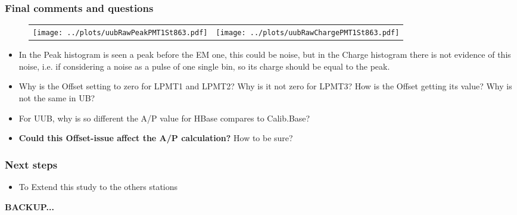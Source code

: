 \documentclass[aspectratio=169]{beamer}
\begin{document}
\begin{frame}
	\frametitle{Final comments and questions}
	
	\begin{figure}
		\centering
		\begin{tabularx}{\textwidth}{CC}
			\texttt{[image: ../plots/uubRawPeakPMT1St863.pdf]}
			&
			\texttt{[image: ../plots/uubRawChargePMT1St863.pdf]}
		\end{tabularx}
	\end{figure}

	\begin{itemize}
		\item In the Peak histogram is seen a peak before the EM one, this could 
			be noise, but in the Charge histogram there is not evidence of this noise,
			i.e. if considering a noise as a pulse of one single bin, so its charge 
			should be equal to the peak.
			\vspace{0.1cm}
		\item Why is the Offset setting to zero for LPMT1 and LPMT2? Why is it not
			zero for LPMT3? How is the Offset getting its value? Why is not the same 
			in UB?
			\vspace{0.1cm}
		\item For UUB, why is so different the A/P value for HBase compares to 
			Calib.Base?
			\vspace{0.1cm}
		\item {\bf Could this Offset-issue affect the A/P calculation?} How to be 
			sure?
	\end{itemize}
\end{frame}


\begin{frame}
	\frametitle{Next steps}
	\begin{itemize}
		\item To Extend this study to the others stations
	\end{itemize}
\end{frame}



\begin{frame}
	
	{\Huge \bf BACKUP...}

\end{frame}
\end{document}
